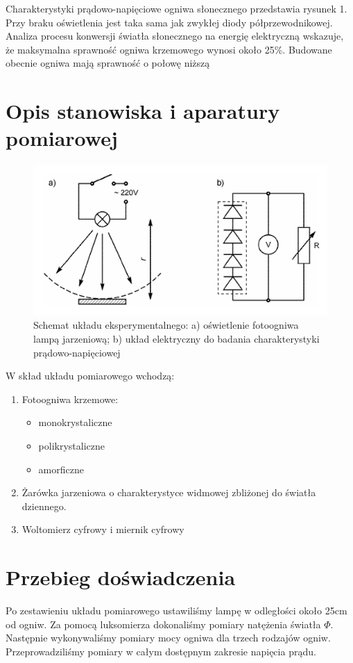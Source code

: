 \documentclass{fizykalab}
\begin{document}
Charakterystyki prądowo-napięciowe ogniwa słonecznego przedstawia rysunek 1. Przy braku oświetlenia jest taka sama
jak zwykłej diody półprzewodnikowej. Analiza procesu konwersji światła słonecznego na energię elektryczną wskazuje, że maksymalna sprawność ogniwa krzemowego wynosi około 25\%. Budowane obecnie
ogniwa mają sprawność o połowę niższą

\section{Opis stanowiska i aparatury pomiarowej}
\begin{figure}[H]
    \centering
    \includegraphics[width=0.5\linewidth]{aparatura_pomiarowa.png}
    \caption{Schemat układu eksperymentalnego: a) oświetlenie fotoogniwa lampą jarzeniową; b) układ elektryczny do badania charakterystyki prądowo-napięciowej }
\end{figure}

W skład układu pomiarowego wchodzą:
\begin{enumerate}
    \item Fotoogniwa krzemowe:
        \begin{itemize}
            \item monokrystaliczne
            \item polikrystaliczne
            \item amorficzne
        \end{itemize}
    \item Żarówka jarzeniowa o charakterystyce widmowej zbliżonej do światła dziennego.
    \item Woltomierz cyfrowy i miernik cyfrowy
\end{enumerate}

\section{Przebieg doświadczenia}
Po zestawieniu układu pomiarowego ustawiliśmy lampę w odległości około 25cm od ogniw.
Za pomocą luksomierza dokonaliśmy pomiary natężenia światła $\Phi$. Następnie wykonywaliśmy
pomiary mocy ogniwa dla trzech rodzajów ogniw.
Przeprowadziliśmy pomiary w całym dostępnym zakresie napięcia prądu.
\end{document}
